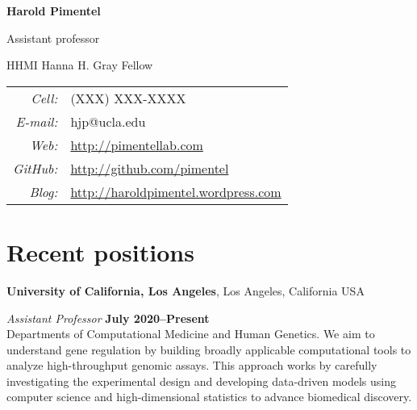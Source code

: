 \documentclass[11pt,notitlepage]{article} %
\begin{document}
\thispagestyle{firststyle}





\begin{center}
  {\Huge \bf Harold Pimentel}

  \medskip
  {\large Assistant professor}

  \medskip

  {\large HHMI Hanna H. Gray Fellow}
\end{center}
\bigskip
\begin{tabular}{r l}
  {\it Cell:}&  {(XXX) XXX-XXXX} \\
  {\it E-mail:}&  {hjp@ucla.edu} \\
  {\it Web:}& {\url{http://pimentellab.com}} \\
  {\it GitHub:}& {\url{http://github.com/pimentel}} \\
  {\it Blog:}& {\url{http://haroldpimentel.wordpress.com}} \\
\end{tabular}

\bigskip
\section*{Recent positions}
\medskip

{\bf University of California, Los Angeles}, Los Angeles, California USA

{\em Assistant Professor} \hfill {\bf July 2020--Present}\\
Departments of Computational Medicine and Human Genetics.
We aim to understand gene regulation by building broadly applicable computational tools to analyze high-throughput genomic assays.
This approach works by carefully investigating the experimental design and developing data-driven models using computer science and high-dimensional statistics to advance biomedical discovery.
\end{document}
